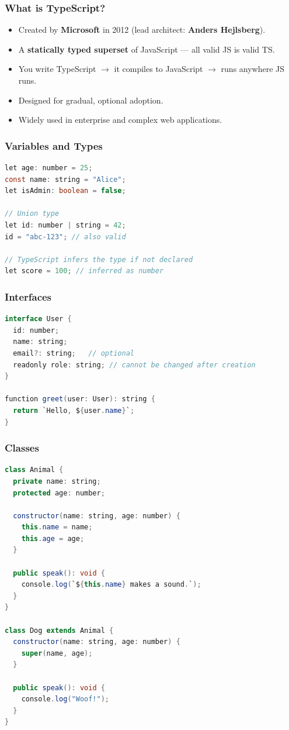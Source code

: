 \documentclass[hidelinks]{article}
\begin{document}
\subsubsection{What is TypeScript?}
\begin{itemize}
  \item Created by \textbf{Microsoft} in 2012 (lead architect: \textbf{Anders Hejlsberg}).
  \item A \textbf{statically typed superset} of JavaScript --- all valid JS is valid TS.
  \item You write TypeScript $\to$ it compiles to JavaScript $\to$ runs anywhere JS runs.
  \item Designed for gradual, optional adoption.
  \item Widely used in enterprise and complex web applications.
\end{itemize}

\subsubsection{Variables and Types}
\begin{lstlisting}[language=Java, caption={TypeScript variable annotations}]
let age: number = 25;
const name: string = "Alice";
let isAdmin: boolean = false;

// Union type
let id: number | string = 42;
id = "abc-123"; // also valid

// TypeScript infers the type if not declared
let score = 100; // inferred as number
\end{lstlisting}

\subsubsection{Interfaces}
\begin{lstlisting}[language=Java, caption={TypeScript interface}]
interface User {
  id: number;
  name: string;
  email?: string;   // optional
  readonly role: string; // cannot be changed after creation
}

function greet(user: User): string {
  return `Hello, ${user.name}`;
}
\end{lstlisting}

\subsubsection{Classes}
\begin{lstlisting}[language=Java, caption={TypeScript class with access modifiers}]
class Animal {
  private name: string;
  protected age: number;

  constructor(name: string, age: number) {
    this.name = name;
    this.age = age;
  }

  public speak(): void {
    console.log(`${this.name} makes a sound.`);
  }
}

class Dog extends Animal {
  constructor(name: string, age: number) {
    super(name, age);
  }

  public speak(): void {
    console.log("Woof!");
  }
}
\end{lstlisting}
\end{document}

